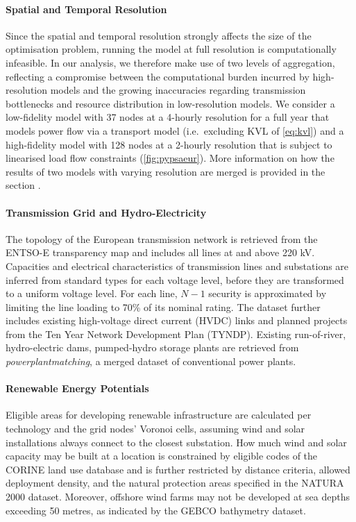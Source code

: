 \paragraph{Spatial and Temporal Resolution}
Since the spatial and temporal resolution strongly affects the size of the
optimisation problem, running the model at full resolution is computationally
infeasible. In our analysis, we therefore make use of two levels of aggregation,
reflecting a compromise between the computational burden incurred by
high-resolution models and the growing inaccuracies regarding transmission
bottlenecks and resource distribution in low-resolution models. We consider a
low-fidelity model with 37 nodes at a 4-hourly resolution for a full year that
models power flow via a transport model (i.e.~excluding KVL of \cref{eq:kvl})
and a high-fidelity model with 128 nodes at a 2-hourly resolution that is
subject to linearised load flow constraints (\cref{fig:pypsaeur}). More
information on how the results of two models with varying resolution are merged
is provided in the section .


\paragraph{Transmission Grid and Hydro-Electricity}
The topology of the European transmission network is retrieved from the ENTSO-E
transparency map and includes all lines at and above 220 kV. Capacities and
electrical characteristics of transmission lines and substations are inferred
from standard types for each voltage level, before they are transformed to a
uniform voltage level. For each line, $N-1$ security is approximated by limiting
the line loading to 70\% of its nominal rating. The dataset further includes
existing high-voltage direct current (HVDC) links and planned projects from the
Ten Year Network Development Plan (TYNDP). Existing run-of-river, hydro-electric
dams, pumped-hydro storage plants are retrieved from
\textit{powerplantmatching}, a merged dataset of conventional power plants.


\paragraph{Renewable Energy Potentials}
Eligible areas for developing renewable infrastructure are calculated
per technology and the grid nodes' Voronoi cells, assuming wind and solar installations always connect to the closest substation.
How much wind and solar capacity may be built at a location is constrained by
eligible codes of the CORINE land use database and is further restricted by distance criteria,
allowed deployment density, and the natural protection areas specified in the NATURA 2000 dataset.
Moreover, offshore wind farms may not be developed at sea depths exceeding 50 metres,
as indicated by the GEBCO bathymetry dataset.

